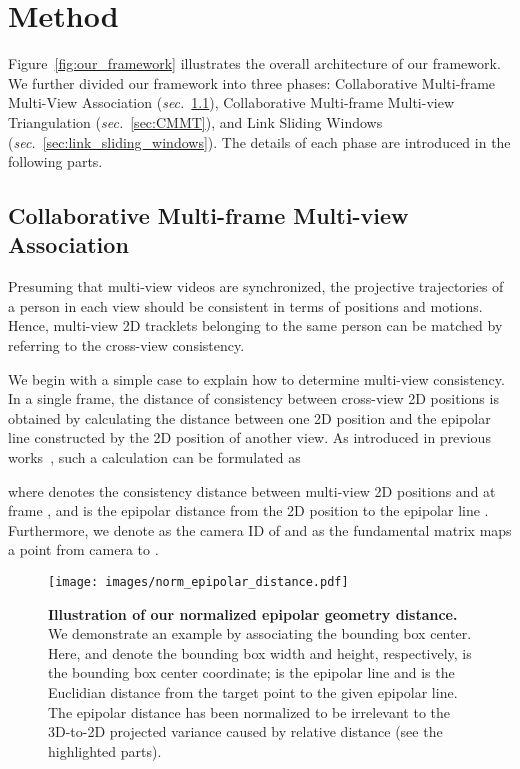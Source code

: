 \documentclass{CVM}
\begin{document}
\section{Method}\label{sec:method}

Figure~\ref{fig:our_framework} illustrates the overall architecture of our framework. We further divided our framework into three phases: Collaborative Multi-frame Multi-View
Association (\textit{sec.}~\ref{sec:CMMA}), Collaborative Multi-frame Multi-view Triangulation (\textit{sec.}~\ref{sec:CMMT}), and Link Sliding Windows (\textit{sec.}~\ref{sec:link_sliding_windows}). The details of each phase are introduced in the following parts.


\subsection{Collaborative Multi-frame Multi-view Association}
\label{sec:CMMA}

  Presuming that multi-view videos are synchronized, the projective trajectories of a person in each view should be consistent in terms of positions and motions. Hence, multi-view 2D tracklets belonging to the same person can be matched by referring to the cross-view consistency. 
  
  We begin with a simple case to explain how to determine multi-view consistency. In a single frame, the distance of consistency between cross-view 2D positions is obtained by calculating the distance between one 2D position and the epipolar line constructed by the 2D position of another view. As introduced in previous works~\cite{canton2005towards, dong2019fast, chen2020cross}, such a calculation can be formulated as

 where  denotes the consistency distance between multi-view 2D positions  and  at frame , and  is the epipolar distance from the 2D position  to the epipolar line . Furthermore, we denote  as the camera ID of  and  as the fundamental matrix maps a point from camera  to .



 \begin{figure}[!h]
  \centering
  \texttt{[image: images/norm\_epipolar\_distance.pdf]}
  \caption{\textbf{Illustration of our normalized epipolar geometry distance.} We demonstrate an example by associating the bounding box center. Here,  and  denote the bounding box width and height, respectively,  is the bounding box center coordinate;  is the epipolar line and  is the Euclidian distance from the target point to the given epipolar line. The epipolar distance has been normalized to be irrelevant to the 3D-to-2D projected variance caused by relative distance (see the highlighted parts). }\label{fig:norm_epipolar_distance}
  \end{figure}
\end{document}
